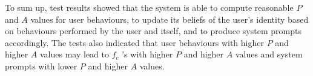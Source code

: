 To sum up, test results showed that the system is able to compute reasonable $P$ and $A$ values for user behaviours, to update its beliefs of the user's identity based on behaviours performed by the user and itself, and to produce system prompts accordingly. The tests also indicated that user behaviours with higher $P$ and higher $A$ values may lead to $f_c$ 's with higher $P$ and higher $A$ values and system prompts with lower $P$ and higher $A$ values.
